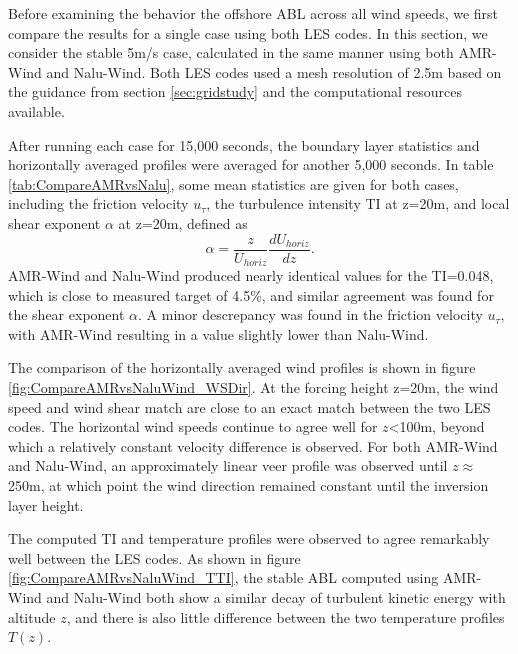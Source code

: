Before examining the behavior the offshore ABL across all wind speeds,
we first compare the results for a single case using both LES codes.
In this section, we consider the stable 5m/s case, calculated in the
same manner using both AMR-Wind and Nalu-Wind.  Both LES codes used a
mesh resolution of 2.5m based on the guidance from section
\ref{sec:gridstudy} and the computational resources available.

After running each case for 15,000 seconds, the boundary layer
statistics and horizontally averaged profiles were averaged for
another 5,000 seconds.  In table \ref{tab:CompareAMRvsNalu}, some mean
statistics are given for both cases, including the friction velocity
$u_\tau$, the turbulence intensity TI at z=20m, and local shear
exponent $\alpha$ at z=20m, defined as
$$ \alpha = \frac{z}{U_{horiz}} \frac{d U_{horiz}}{dz}.
$$ AMR-Wind and Nalu-Wind produced nearly identical values for the
TI=0.048, which is close to measured target of 4.5\%, and similar
agreement was found for the shear exponent $\alpha$.  A minor
descrepancy was found in the friction velocity $u_\tau$, with AMR-Wind
resulting in a value slightly lower than Nalu-Wind.

The comparison of the horizontally averaged wind profiles is shown in
figure \ref{fig:CompareAMRvsNaluWind_WSDir}.  At the forcing height
z=20m, the wind speed and wind shear match are close to an exact match
between the two LES codes.  The horizontal wind speeds continue to
agree well for $z$<100m, beyond which a relatively constant velocity
difference is observed.   For both AMR-Wind and Nalu-Wind, an
approximately linear veer profile was observed until $z\approx$ 250m,
at which point the wind direction remained constant until the
inversion layer height.

The computed TI and temperature profiles were observed to agree
remarkably well between the LES codes. As shown in figure
\ref{fig:CompareAMRvsNaluWind_TTI}, the stable ABL computed using
AMR-Wind and Nalu-Wind both show a similar decay of turbulent kinetic
energy with altitude $z$, and there is also little difference between
the two temperature profiles $T(z)$.

